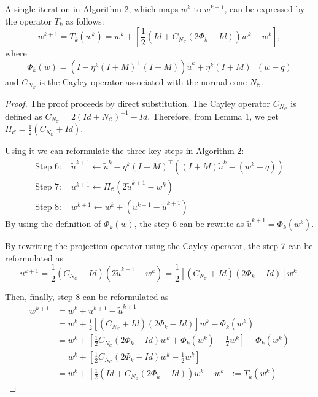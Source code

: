 \documentclass[10pt,a4paper]{amsart}
\begin{document}
\begin{lemma}
\label{lem:T_k}
A single iteration in Algorithm 2, which maps $w^k$ to $w^{k+1}$, can be expressed by the operator $T_k$ as follows:
$$
w^{k+1} = T_k(w^k) = w^k + \left[\frac{1}{2}(Id + C_{N_\mathcal{C}}(2\Phi_k -Id))w^k - w^k\right],
$$
where 
$$
\Phi_k(w) = \left(I - \eta^k (I+M)^\top (I+M)\right)\tilde{u}^k + \eta^k (I+M)^\top (w-q)
$$ and $C_{N_\mathcal{C}}$ is the Cayley operator associated with the normal cone $N_{\mathcal{C}}$.
\end{lemma}

\begin{proof}
The proof proceeds by direct substitution.
The Cayley operator $C_{N_\mathcal{C}}$ is defined as $C_{N_\mathcal{C}} = 2(Id + N_{\mathcal{C}})^{-1} - Id$.
Therefore, from Lemma 1, we get $\Pi_\mathcal{C} = \frac{1}{2}(C_{N_\mathcal{C}} + Id)$.

Using it we can reformulate the three key steps in Algorithm 2:
$$
\begin{aligned}
\text{Step 6: }& \tilde{u}^{k+1} \gets \tilde{u}^k - \eta^k(I+M)^\top ((I+M)\tilde{u}^k - (w^k-q))\\
\text{Step 7: }& u^{k+1} \gets \Pi_\mathcal{C}\left(2 \tilde{u}^{k+1} - w^k\right)\\
\text{Step 8: }& w^{k+1} \gets w^k + \left(u^{k+1} - \tilde{u}^{k+1}\right)
\end{aligned}
$$
By using the definition of $\Phi_k(w)$, the step 6 can be rewrite as $\tilde{u}^{k+1} = \Phi_k(w^k)$.  

By rewriting the projection operator using the Cayley operator, the step 7 can be reformulated as 
$$
u^{k+1} = \frac{1}{2}(C_{N_\mathcal{C}} + Id)(2\tilde{u}^{k+1}-w^k) = \frac{1}{2}\left[(C_{N_\mathcal{C}} + Id)(2\Phi_k - Id)\right]w^k.
$$

Then, finally, step 8 can be reformulated as
$$
\begin{aligned}
w^{k+1} &= w^k + u^{k+1} - \tilde{u}^{k+1} \\
&= w^k + \frac{1}{2}\left[(C_{N_\mathcal{C}} + Id)(2\Phi_k - Id)\right]w^k - \Phi_k(w^k) \\
&= w^k + \left[\frac{1}{2}C_{N_\mathcal{C}}(2\Phi_k - Id)w^k + \Phi_k(w^k) - \frac{1}{2}w^k\right] - \Phi_k(w^k) \\
&= w^k + \left[\frac{1}{2}C_{N_\mathcal{C}}(2\Phi_k - Id)w^k  - \frac{1}{2}w^k\right] \\
&= w^k + \left[\frac{1}{2}(Id + C_{N_\mathcal{C}}(2\Phi_k -Id))w^k - w^k\right] := T_k(w^k)
\end{aligned}
$$
\end{proof}
\end{document}

